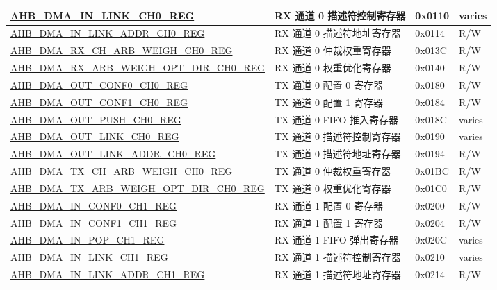 \begin{longtable}{ | l | l | p{1.3cm} | l | }
\hyperref[regdesc:AHBDMAINLINKCHNREG]{AHB\_DMA\_IN\_LINK\_CH0\_REG} & RX 通道 0 描述符控制寄存器 & 0x0110 & varies    \\ \hline
\hyperref[regdesc:AHBDMAINLINKADDRCHNREG]{AHB\_DMA\_IN\_LINK\_ADDR\_CH0\_REG} & RX 通道 0 描述符地址寄存器 & 0x0114 & R/W    \\ \hline
\hyperref[regdesc:AHBDMARXCHARBWEIGHCHNREG]{AHB\_DMA\_RX\_CH\_ARB\_WEIGH\_CH0\_REG} & RX 通道 0 仲裁权重寄存器 & 0x013C & R/W    \\ \hline
\hyperref[regdesc:AHBDMARXARBWEIGHOPTDIRCHNREG]{AHB\_DMA\_RX\_ARB\_WEIGH\_OPT\_DIR\_CH0\_REG} & RX 通道 0 权重优化寄存器 & 0x0140 & R/W    \\ \hline
\hyperref[regdesc:AHBDMAOUTCONF0CHNREG]{AHB\_DMA\_OUT\_CONF0\_CH0\_REG} & TX 通道 0 配置 0 寄存器 & 0x0180 & R/W    \\ \hline
\hyperref[regdesc:AHBDMAOUTCONF1CHNREG]{AHB\_DMA\_OUT\_CONF1\_CH0\_REG} & TX 通道 0 配置 1 寄存器 & 0x0184 & R/W    \\ \hline
\hyperref[regdesc:AHBDMAOUTPUSHCHNREG]{AHB\_DMA\_OUT\_PUSH\_CH0\_REG} & TX 通道 0 FIFO 推入寄存器 & 0x018C & varies    \\ \hline
\hyperref[regdesc:AHBDMAOUTLINKCHNREG]{AHB\_DMA\_OUT\_LINK\_CH0\_REG} & TX 通道 0 描述符控制寄存器 & 0x0190 & varies    \\ \hline
\hyperref[regdesc:AHBDMAOUTLINKADDRCHNREG]{AHB\_DMA\_OUT\_LINK\_ADDR\_CH0\_REG} & TX 通道 0 描述符地址寄存器 & 0x0194 & R/W    \\ \hline
\hyperref[regdesc:AHBDMATXCHARBWEIGHCHNREG]{AHB\_DMA\_TX\_CH\_ARB\_WEIGH\_CH0\_REG} & TX 通道 0 仲裁权重寄存器 & 0x01BC & R/W    \\ \hline
\hyperref[regdesc:AHBDMATXARBWEIGHOPTDIRCHNREG]{AHB\_DMA\_TX\_ARB\_WEIGH\_OPT\_DIR\_CH0\_REG} & TX 通道 0 权重优化寄存器 & 0x01C0 & R/W    \\ \hline
\hyperref[regdesc:AHBDMAINCONF0CHNREG]{AHB\_DMA\_IN\_CONF0\_CH1\_REG} & RX 通道 1 配置 0 寄存器 & 0x0200 & R/W    \\ \hline
\hyperref[regdesc:AHBDMAINCONF1CHNREG]{AHB\_DMA\_IN\_CONF1\_CH1\_REG} & RX 通道 1 配置 1 寄存器 & 0x0204 & R/W    \\ \hline
\hyperref[regdesc:AHBDMAINPOPCHNREG]{AHB\_DMA\_IN\_POP\_CH1\_REG} & RX 通道 1 FIFO 弹出寄存器 & 0x020C & varies    \\ \hline
\hyperref[regdesc:AHBDMAINLINKCHNREG]{AHB\_DMA\_IN\_LINK\_CH1\_REG} & RX 通道 1 描述符控制寄存器 & 0x0210 & varies    \\ \hline
\hyperref[regdesc:AHBDMAINLINKADDRCHNREG]{AHB\_DMA\_IN\_LINK\_ADDR\_CH1\_REG} & RX 通道 1 描述符地址寄存器 & 0x0214 & R/W    \\ \hline

\end{longtable}
